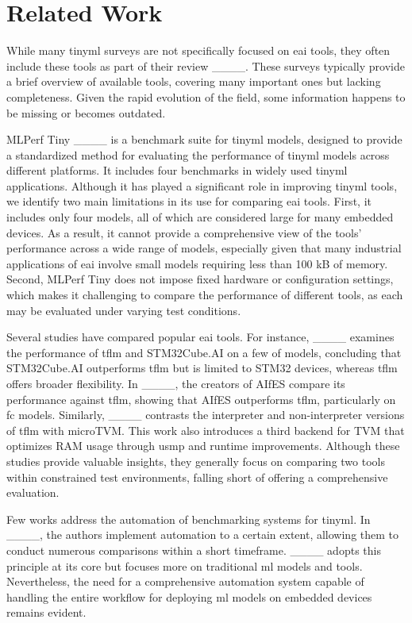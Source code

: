 \section{Related Work}
\label{sec:related_work}

While many \gls{tinyml} surveys are not specifically focused on \gls{eai} tools, they often include these tools as part of their review ____. These surveys typically provide a brief overview of available tools, covering many important ones but lacking completeness. Given the rapid evolution of the field, some information happens to be missing or becomes outdated.

MLPerf Tiny ____ is a benchmark suite for \gls{tinyml} models, designed to provide a standardized method for evaluating the performance of \gls{tinyml} models across different platforms. It includes four benchmarks in widely used \gls{tinyml} applications. Although it has played a significant role in improving \gls{tinyml} tools, we identify two main limitations in its use for comparing \gls{eai} tools. First, it includes only four models, all of which are considered large for many embedded devices. As a result, it cannot provide a comprehensive view of the tools' performance across a wide range of models, especially given that many industrial applications of \gls{eai} involve small models requiring less than 100 kB of memory. Second, MLPerf Tiny does not impose fixed hardware or configuration settings, which makes it challenging to compare the performance of different tools, as each may be evaluated under varying test conditions.

Several studies have compared popular \gls{eai} tools. For instance, ____ examines the performance of \gls{tflm} and STM32Cube.AI on a few of models, concluding that STM32Cube.AI outperforms \gls{tflm} but is limited to STM32 devices, whereas \gls{tflm} offers broader flexibility. In ____, the creators of AIfES compare its performance against \gls{tflm}, showing that AIfES outperforms \gls{tflm}, particularly on \gls{fc} models. Similarly, ____ contrasts the interpreter and non-interpreter versions of \gls{tflm} with microTVM. This work also introduces a third backend for TVM that optimizes RAM usage through \gls{usmp} and runtime improvements. Although these studies provide valuable insights, they generally focus on comparing two tools within constrained test environments, falling short of offering a comprehensive evaluation.

Few works address the automation of benchmarking systems for \gls{tinyml}. In ____, the authors implement automation to a certain extent, allowing them to conduct numerous comparisons within a short timeframe. ____ adopts this principle at its core but focuses more on traditional \gls{ml} models and tools. Nevertheless, the need for a comprehensive automation system capable of handling the entire workflow for deploying \gls{ml} models on embedded devices remains evident.
